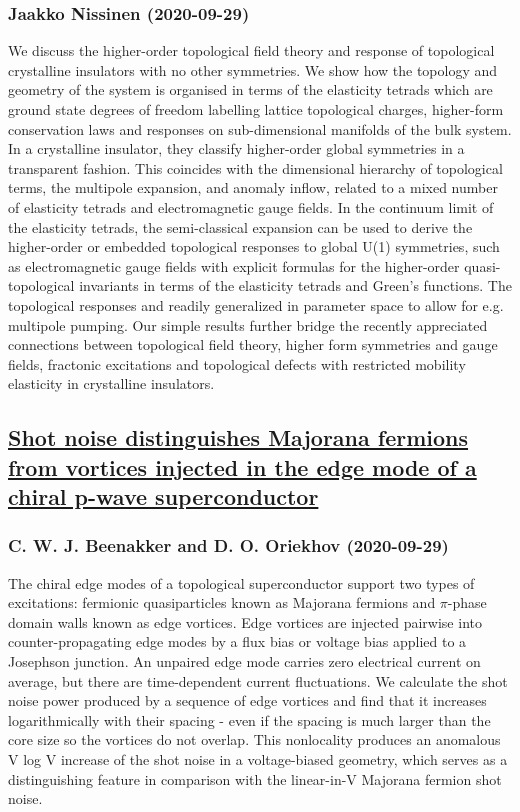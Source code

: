 \subsubsection*{Jaakko Nissinen (2020-09-29)}
We discuss the higher-order topological field theory and response of
topological crystalline insulators with no other symmetries. We show how the
topology and geometry of the system is organised in terms of the elasticity
tetrads which are ground state degrees of freedom labelling lattice topological
charges, higher-form conservation laws and responses on sub-dimensional
manifolds of the bulk system. In a crystalline insulator, they classify
higher-order global symmetries in a transparent fashion. This coincides with
the dimensional hierarchy of topological terms, the multipole expansion, and
anomaly inflow, related to a mixed number of elasticity tetrads and
electromagnetic gauge fields. In the continuum limit of the elasticity tetrads,
the semi-classical expansion can be used to derive the higher-order or embedded
topological responses to global U(1) symmetries, such as electromagnetic gauge
fields with explicit formulas for the higher-order quasi-topological invariants
in terms of the elasticity tetrads and Green's functions. The topological
responses and readily generalized in parameter space to allow for e.g.
multipole pumping. Our simple results further bridge the recently appreciated
connections between topological field theory, higher form symmetries and gauge
fields, fractonic excitations and topological defects with restricted mobility
elasticity in crystalline insulators.

\subsection*{\href{http://arxiv.org/abs/2009.14173v1}{Shot noise distinguishes Majorana fermions from vortices injected in the  edge mode of a chiral p-wave superconductor}}
\subsubsection*{C. W. J. Beenakker and D. O. Oriekhov (2020-09-29)}
The chiral edge modes of a topological superconductor support two types of
excitations: fermionic quasiparticles known as Majorana fermions and
$\pi$-phase domain walls known as edge vortices. Edge vortices are injected
pairwise into counter-propagating edge modes by a flux bias or voltage bias
applied to a Josephson junction. An unpaired edge mode carries zero electrical
current on average, but there are time-dependent current fluctuations. We
calculate the shot noise power produced by a sequence of edge vortices and find
that it increases logarithmically with their spacing - even if the spacing is
much larger than the core size so the vortices do not overlap. This nonlocality
produces an anomalous V log V increase of the shot noise in a voltage-biased
geometry, which serves as a distinguishing feature in comparison with the
linear-in-V Majorana fermion shot noise.


